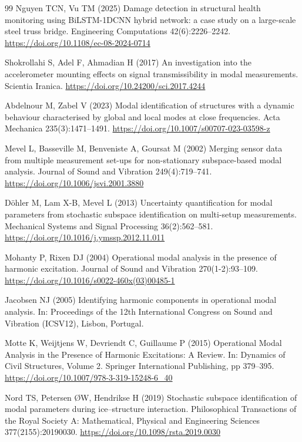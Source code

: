 \documentclass[11pt]{article}
\begin{document}
\begin{thebibliography}{99}
Nguyen TCN, Vu TM (2025) Damage detection in structural health monitoring using BiLSTM-1DCNN hybrid network: a case study on a large-scale steel truss bridge. Engineering Computations 42(6):2226--2242. \url{https://doi.org/10.1108/ec-08-2024-0714}

Shokrollahi S, Adel F, Ahmadian H (2017) An investigation into the accelerometer mounting effects on signal transmissibility in modal measurements. Scientia Iranica. \url{https://doi.org/10.24200/sci.2017.4244}

Abdelnour M, Zabel V (2023) Modal identification of structures with a dynamic behaviour characterised by global and local modes at close frequencies. Acta Mechanica 235(3):1471--1491. \url{https://doi.org/10.1007/s00707-023-03598-z}

Mevel L, Basseville M, Benveniste A, Goursat M (2002) Merging sensor data from multiple measurement set-ups for non-stationary subspace-based modal analysis. Journal of Sound and Vibration 249(4):719--741. \url{https://doi.org/10.1006/jsvi.2001.3880}

D{\"o}hler M, Lam X-B, Mevel L (2013) Uncertainty quantification for modal parameters from stochastic subspace identification on multi-setup measurements. Mechanical Systems and Signal Processing 36(2):562--581. \url{https://doi.org/10.1016/j.ymssp.2012.11.011}

Mohanty P, Rixen DJ (2004) Operational modal analysis in the presence of harmonic excitation. Journal of Sound and Vibration 270(1-2):93--109. \url{https://doi.org/10.1016/s0022-460x(03)00485-1}

Jacobsen NJ (2005) Identifying harmonic components in operational modal analysis. In: Proceedings of the 12th International Congress on Sound and Vibration (ICSV12), Lisbon, Portugal.

Motte K, Weijtjens W, Devriendt C, Guillaume P (2015) Operational Modal Analysis in the Presence of Harmonic Excitations: A Review. In: Dynamics of Civil Structures, Volume 2. Springer International Publishing, pp 379--395. \url{https://doi.org/10.1007/978-3-319-15248-6_40}

Nord TS, Petersen {\O}W, Hendrikse H (2019) Stochastic subspace identification of modal parameters during ice--structure interaction. Philosophical Transactions of the Royal Society A: Mathematical, Physical and Engineering Sciences 377(2155):20190030. \url{https://doi.org/10.1098/rsta.2019.0030}


\end{thebibliography}
\end{document}
